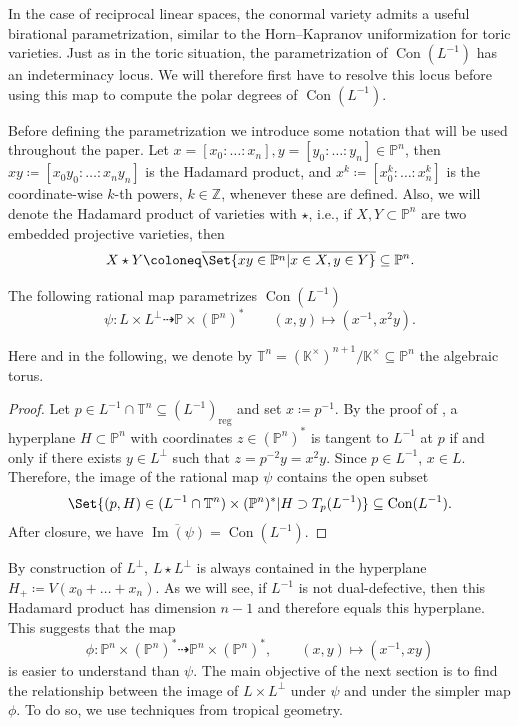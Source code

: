 \documentclass[12pt,a4paper,english]{scrartcl}
\newcommand{\ZZ}{\mathbb{Z}}
\newcommand{\KK}{\mathbb{K}}
\newcommand{\PP}{\mathbb{P}}
\newcommand{\TT}{\mathbb{T}}
\newcommand{\reg}{\mathrm{reg}}
\DeclareMathOperator{\Con}{Con}
\renewcommand{\Im}{\operatorname{Im}}
\begin{document}
In the case of reciprocal linear spaces, the conormal variety admits a useful birational parametrization, similar to the Horn--Kapranov uniformization for toric varieties. Just as in the toric situation, the parametrization of $\Con(L^{-1})$ has an indeterminacy locus. We will therefore first have to resolve this locus before using this map to compute the polar degrees of $\Con(L^{-1})$.

Before defining the parametrization we introduce some notation that will be used throughout the paper.
Let $x = [x_0:\dots:x_n], y = [y_0:\dots:y_n] \in \PP^n$, then $xy \coloneq [x_0y_0: \dots :x_ny_n]$ is the Hadamard product, and $x^k \coloneq [x_0^k:\dots:x_n^k]$ is the coordinate-wise $k$-th powers, $k \in \ZZ$, whenever these are defined. Also, we will denote the Hadamard product of varieties with $\star$, i.e., if $X,Y \subset \PP^n$ are two embedded projective varieties, then
\[
X \star Y \coloneq \overline{\Set{xy \in \PP^n | x\in X, y \in Y }} \subseteq \PP^n.
\]
\begin{proposition}\label{prop: parametrization}
The following rational map parametrizes $\Con(L^{-1})$
\[
\psi\colon  L \times L^\perp \dashrightarrow \PP \times (\PP^n)^* \qquad (x, y) \mapsto (x^{-1}, x^2y).
\]
\end{proposition}
Here and in the following, we denote by $\TT^n = (\KK^\times)^{n+1}/\KK^\times \subseteq \PP^n$ the algebraic torus.
\begin{proof}
Let $p \in L^{-1} \cap \TT^n \subseteq (L^{-1})_\reg$ and set $x \coloneq p^{-1}$.
By the proof of \cite[Proposition 4.1]{MatsubaraHeoTelen2026}, a hyperplane $H \subset \PP^n$ with coordinates $z \in (\PP^n)^*$ is tangent to $L^{-1}$ at $p$ if and only if there exists $y \in L^\perp$ such that $z = p^{-2} y = x^2y$. Since $p \in L^{-1}$, $x \in L$. Therefore, the image of the rational map $\psi$ contains the open subset
\[
\Set{(p, H) \in (L^{-1}\cap \TT^n) \times (\PP^n)^* | H \supset T_{p}(L^{-1}) } \subseteq \Con(L^{-1}).
\]
After closure, we have $\overline{\Im(\psi)} = \Con(L^{-1})$.
\end{proof}

By construction of $L^\perp$, $L\star L^{\perp}$ is always contained in the hyperplane $H_+ \coloneq V(x_0+\dots+x_n)$. As we will see, if $L^{-1}$ is not dual-defective, then this Hadamard product has dimension $n-1$ and therefore equals this hyperplane. This suggests that the map
\[
\phi \colon \PP^n \times (\PP^n)^*\dashrightarrow \PP^n \times (\PP^n)^*, \qquad (x,y) \mapsto (x^{-1}, xy) 
\]
is easier to understand than $\psi$. The main objective of the next section is to find the relationship between the image of $L\times L^\perp$ under $\psi$ and under the simpler map $\phi$. To do so, we use techniques from tropical geometry.
\end{document}
